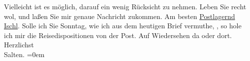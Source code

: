 \begin{ledgroupsized}[t]{13cm}
           \pstart
           Vielleicht ist es möglich, darauf ein wenig Rücksicht zu nehmen.\pend
           \pstart
           {\pb}Leben Sie recht wol, und
               laßen Sie mir genaue Nachricht zukommen. Am besten \uline{Postlagernd Ischl}.\pend
           \pstart
           Solle ich Sie Sonntag, wie ich aus dem heutigen Brief
               vermuthe, \label{K_L03308-4v}\label{K_L03308-4h}, so hole ich mir die
               Reisedispositionen von der Post.\pend
           \pstart
           Auf Wiedersehen da oder dort. {\\[\baselineskip]}Herzlichst {\\[\baselineskip]}\spacefill\mbox{Salten.}\pend
           \leftskip=0em{}
         
         \endnumbering{}\end{ledgroupsized}  \newcommand{\dateiname}{L03308}\newcommand{\titel}{Felix Salten an Arthur Schnitzler, 7. 8. 1900}\newcommand{\editorInnen}{Martin Anton Müller und Laura Untner}
      